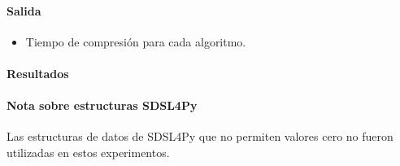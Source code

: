 \paragraph{Salida}
\begin{itemize}
    \item Tiempo de compresión para cada algoritmo.
\end{itemize}

\paragraph{Resultados}
\vspace{0.5em}
\noindent

\SDSLFourPyCompressionTimeComparison

\paragraph{Nota sobre estructuras SDSL4Py}
Las estructuras de datos de SDSL4Py que no permiten valores cero no fueron utilizadas en estos experimentos.
